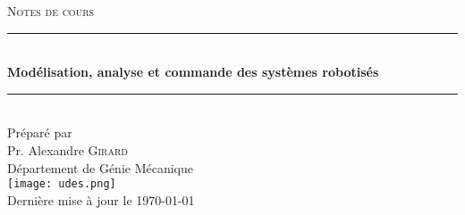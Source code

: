 ﻿%

\begin{titlepage}

\center 
 

\textsc{\LARGE 
Notes de cours
}\\[1.5cm] 




\rule{\linewidth}{0.5mm} \\[0.4cm]
{\huge \bfseries 
Modélisation, analyse et commande des systèmes robotisés
}\\[0.4cm] 
\rule{\linewidth}{0.5mm} \\[1.5cm]
 
{\large Préparé par}\\[1cm]
{\LARGE Pr. Alexandre \textsc{Girard} }\\[1cm] 
{\LARGE Département de Génie Mécanique }\\[2cm]

\texttt{[image: udes.png]}\\[1cm] 

{\large Dernière mise à jour le \today}\\[1.5cm] 

\vfill 

\end{titlepage}
\restoregeometry